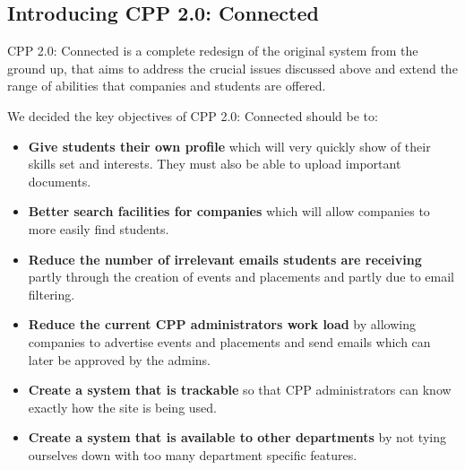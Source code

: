 \subsection{Introducing CPP 2.0: Connected}
CPP 2.0: Connected is a complete redesign of the original system from the ground up, that aims to address the crucial issues discussed above and extend the range of abilities that companies and students are offered.

We decided the key objectives of CPP 2.0: Connected should be to:
\begin{itemize}
  \item \textbf{Give students their own profile} which will very quickly show of their skills set and interests. They must also be able to upload important documents.
  \item \textbf{Better search facilities for companies} which will allow companies to more easily find students.
  \item \textbf{Reduce the number of irrelevant emails students are receiving} partly through the creation of events and placements and partly due to email filtering.
  \item \textbf{Reduce the current CPP administrators work load} by allowing companies to advertise events and placements and send emails which can later be approved by the admins.
  \item \textbf{Create a system that is trackable} so that CPP administrators can know exactly how the site is being used.
  \item \textbf{Create a system that is available to other departments} by not tying ourselves down with too many department specific features.
\end{itemize}